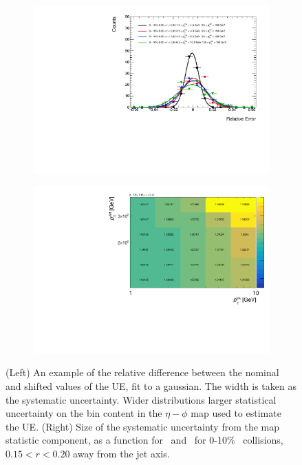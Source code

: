 \begin{figure}
\begin{subfigure}{0.5\textwidth}
\centering
\includegraphics[width=1\textwidth]{figures/main/systematics/map_stat_gaus}
\caption{}
\label{fig:gaus_diff}
\end{subfigure}
\begin{subfigure}{0.5\textwidth}
\centering
\includegraphics[width=1\textwidth]{figures/main/systematics/map_stat_size}
\caption{}
\label{fig:mapstat_corr}
\end{subfigure}
\caption{(Left) An example of the relative difference between the nominal and shifted values of the UE, fit to a gaussian. The width is taken as the systematic uncertainty.
Wider distributions larger statistical uncertainty on the bin content in the $\eta-\phi$ map used to estimate the UE.
(Right) Size of the systematic uncertainty from the map statistic component, as a function for \pttrk\ and \ptjet\ for 0-10\% \pbpb\ collisions, $0.15 < r < 0.20$ away from the jet axis.}
\end{figure}

